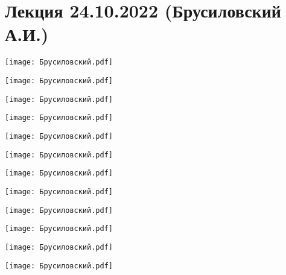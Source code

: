 \documentclass[main.tex]{subfiles}
\begin{document}
\section{Лекция 24.10.2022 (Брусиловский А.И.)}

\begin{center}
\texttt{[image: Брусиловский.pdf]}
\end{center}

\begin{center}
\texttt{[image: Брусиловский.pdf]}
\end{center}

\begin{center}
\texttt{[image: Брусиловский.pdf]}
\end{center}

\begin{center}
\texttt{[image: Брусиловский.pdf]}
\end{center}

\begin{center}
\texttt{[image: Брусиловский.pdf]}
\end{center}

\begin{center}
\texttt{[image: Брусиловский.pdf]}
\end{center}

\begin{center}
\texttt{[image: Брусиловский.pdf]}
\end{center}

\begin{center}
\texttt{[image: Брусиловский.pdf]}
\end{center}

\begin{center}
\texttt{[image: Брусиловский.pdf]}
\end{center}

\begin{center}
\texttt{[image: Брусиловский.pdf]}
\end{center}

\begin{center}
\texttt{[image: Брусиловский.pdf]}
\end{center}

\begin{center}
\texttt{[image: Брусиловский.pdf]}
\end{center}
\end{document}
